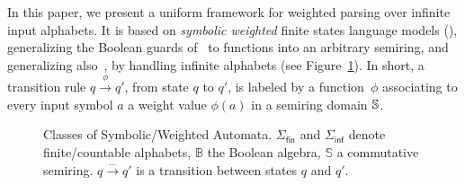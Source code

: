 In this paper, we present a uniform framework for weighted parsing over infinite input alphabets.
It is based on \emph{symbolic weighted} finite states language models (\swM),
generalizing the Boolean guards of~\SA %
to functions into an arbitrary semiring,
and generalizing also~\WA, by handling infinite alphabets (see Figure~\ref{fig:hierarchy}).
%
In short, a transition rule $q \xrightarrow{\phi} q'$, from state $q$ to $q'$,
is labeled by a function~$\phi$ associating to every input symbol $a$ a weight value $\phi(a)$
in a semiring domain $\mathbb{S}$.
%
\begin{figure}
\centering
{}
\caption{Classes of Symbolic/Weighted Automata.
$\Sigma_\mathsf{fin}$ and $\Sigma_\mathsf{inf}$ denote finite/countable alphabets,
$\mathbb{B}$  the Boolean algebra,
$\mathbb{S}$ a commutative semiring.
$q \xrightarrow{\dots} q'$ is a transition between states $q$ and $q'$.}
\label{fig:hierarchy}
\end{figure}
%

